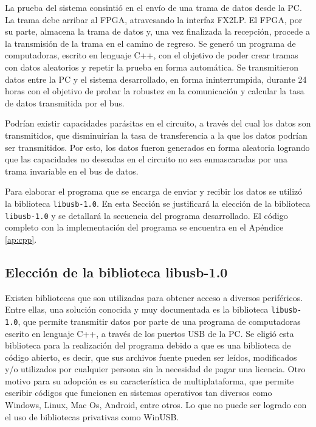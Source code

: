 
La prueba del sistema consintió en el envío de una trama de datos desde la PC. La trama debe arribar al FPGA, atravesando la interfaz FX2LP.
El FPGA, por su parte, almacena la trama de datos y, una vez finalizada la recepción, procede a la transmisión de la trama en el camino de regreso. 
Se generó un programa de computadoras, escrito en lenguaje C++, con el objetivo de poder crear tramas con datos aleatorios y repetir la prueba en forma automática.
Se transmitieron datos entre la PC y el sistema desarrollado, en forma ininterrumpida, durante 24 horas con el objetivo de probar la robustez en la comunicación y calcular la tasa de datos transmitida por el bus.

Podrían existir capacidades parásitas en el circuito, a través del cual los datos son transmitidos, que disminuirían la tasa de transferencia a la que los datos podrían ser transmitidos. Por esto, los datos fueron generados en forma aleatoria logrando que las capacidades no deseadas en el circuito no sea enmascaradas por una trama invariable en el bus de datos.

Para elaborar el programa que se encarga de enviar y recibir los datos se utilizó la biblioteca \verb|libusb-1.0|.
En esta Sección se justificará la elección de la biblioteca \verb|libusb-1.0| y se detallará la secuencia del programa desarrollado.
El código completo con la implementación del programa se encuentra en el Apéndice \ref{ap:cpp}.

\subsection{Elección de la biblioteca libusb-1.0}
	Existen bibliotecas que son utilizadas para obtener acceso a diversos periféricos. Entre ellas, una solución conocida y muy documentada es la biblioteca \verb|libusb-1.0|, que permite transmitir datos por parte de una programa de computadoras escrito en lenguaje C++, a través de los puertos USB de la PC.
	Se eligió esta biblioteca para la realización del programa debido a que es una biblioteca de código abierto, es decir, que sus archivos fuente pueden ser leídos, modificados y/o utilizados por cualquier persona sin la necesidad de pagar una licencia.  Otro motivo para su adopción es su característica de multiplataforma, que permite escribir códigos que funcionen en sistemas operativos tan diversos como Windows, Linux, Mac Os, Android, entre otros. Lo que no puede ser logrado con el uso de bibliotecas privativas como WinUSB.
	
